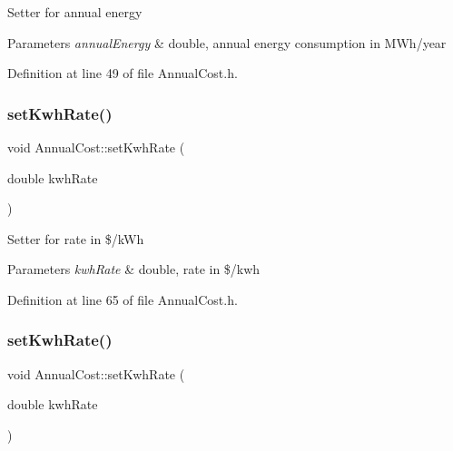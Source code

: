 Setter for annual energy 
\begin{DoxyParams}{Parameters}
{\em annual\+Energy} & double, annual energy consumption in M\+Wh/year \\
\hline
\end{DoxyParams}


Definition at line 49 of file Annual\+Cost.\+h.

\mbox{\label{class_annual_cost_a45a1259c9912c7202dff446c290210e9}} 
\subsubsection{\texorpdfstring{set\+Kwh\+Rate()}{setKwhRate()}\hspace{0.1cm}{\footnotesize\ttfamily [1/3]}}
{\footnotesize\ttfamily void Annual\+Cost\+::set\+Kwh\+Rate (\begin{DoxyParamCaption}\item[{double}]{kwh\+Rate }\end{DoxyParamCaption})\hspace{0.3cm}{\ttfamily [inline]}}

Setter for rate in \$/k\+Wh 
\begin{DoxyParams}{Parameters}
{\em kwh\+Rate} & double, rate in \$/kwh \\
\hline
\end{DoxyParams}


Definition at line 65 of file Annual\+Cost.\+h.

\mbox{\label{class_annual_cost_a45a1259c9912c7202dff446c290210e9}} 
\subsubsection{\texorpdfstring{set\+Kwh\+Rate()}{setKwhRate()}\hspace{0.1cm}{\footnotesize\ttfamily [2/3]}}
{\footnotesize\ttfamily void Annual\+Cost\+::set\+Kwh\+Rate (\begin{DoxyParamCaption}\item[{double}]{kwh\+Rate }\end{DoxyParamCaption})\hspace{0.3cm}{\ttfamily [inline]}}

